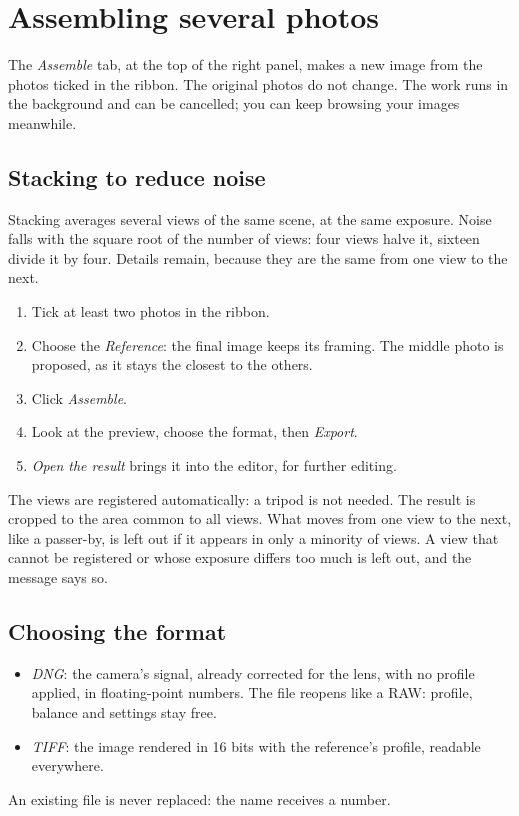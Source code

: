 \chapter{Assembling several photos}
The \emph{Assemble} tab, at the top of the right panel, makes a new image from the
photos ticked in the ribbon. The original photos do not change. The work runs in the
background and can be cancelled; you can keep browsing your images meanwhile.

\section{Stacking to reduce noise}
Stacking averages several views of the same scene, at the same exposure. Noise falls
with the square root of the number of views: four views halve it, sixteen divide it by
four. Details remain, because they are the same from one view to the next.

\begin{enumerate}
\item Tick at least two photos in the ribbon.
\item Choose the \emph{Reference}: the final image keeps its framing. The middle photo
is proposed, as it stays the closest to the others.
\item Click \emph{Assemble}.
\item Look at the preview, choose the format, then \emph{Export}.
\item \emph{Open the result} brings it into the editor, for further editing.
\end{enumerate}

The views are registered automatically: a tripod is not needed. The result is cropped to
the area common to all views. What moves from one view to the next, like a passer-by, is
left out if it appears in only a minority of views. A view that cannot be registered or
whose exposure differs too much is left out, and the message says so.

\section{Choosing the format}
\begin{itemize}
\item \emph{DNG}: the camera's signal, already corrected for the lens, with no profile
applied, in floating-point numbers. The file reopens like a RAW: profile, balance and
settings stay free.
\item \emph{TIFF}: the image rendered in 16 bits with the reference's profile, readable
everywhere.
\end{itemize}
An existing file is never replaced: the name receives a number.

